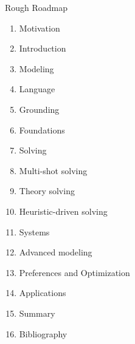 \begin{frame}{Rough Roadmap}
  \begin{enumerate}
  \item Motivation
  \item Introduction
  \item Modeling
  \item Language
  \item Grounding
  \item Foundations
  \item Solving
  \item Multi-shot solving
  \item Theory solving
  \item Heuristic-driven solving
  \item Systems
  \item Advanced modeling
  \item Preferences and Optimization
  \item Applications
  \item Summary
  \item [] Bibliography
  \end{enumerate}
\end{frame}
